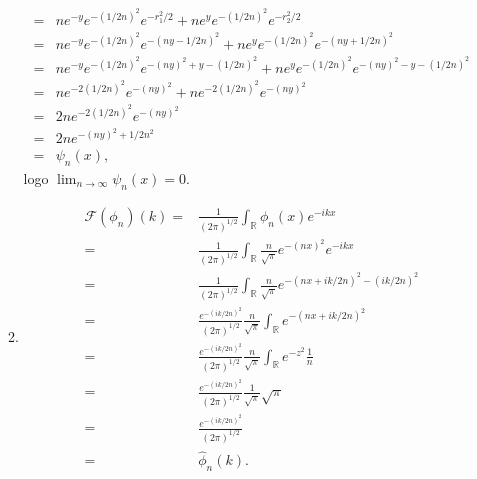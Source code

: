 \documentclass{article}
\begin{document}
\begin{enumerate}
\begin{enumerate}
$$\begin{aligned}
					\\
					= & ne^{-y}e^{- (1/2n)^{2}} e^{-r_{1}^{2}/2}+ ne^{y}e^{ - (1/2n)^{2}} e^{-r_{2}^{2}/2}
					\\
					= & ne^{-y}e^{- (1/2n)^{2}} e^{-(ny-1/2n)^{2}}+ ne^{y}e^{ - (1/2n)^{2}} e^{-(ny+1/2n)^{2}}
					\\
					= & ne^{-y}e^{- (1/2n)^{2}} e^{-(ny)^{2}+y - (1/2n)^{2}}+ ne^{y}e^{ - (1/2n)^{2}}e^{-(ny)^{2}-y - (1/2n)^{2}}
					\\
					= & ne^{- 2(1/2n)^{2}} e^{-(ny)^{2}}+ ne^{ -2 (1/2n)^{2}}e^{-(ny)^{2}}
					\\
					= & 2ne^{- 2(1/2n)^{2}} e^{-(ny)^{2}}
					\\
					= & 2n e^{-(ny)^{2}+  1/2n^{2}}
					\\
					= & \psi_{n}(x),
					\end{aligned}
					$$
					logo $\lim_{n \to \infty} \psi_{n}(x) = 0$.
					
					\item
						$$
						\begin{aligned}
						\mathcal{F}(\phi_{n})(k) = & \frac{1}{(2\pi)^{1/2}}\int_{\mathbb{R}} \phi_{n}(x)e^{-ikx}
						\\
						 = & \frac{1}{(2\pi)^{1/2}}\int_{\mathbb{R}} \frac{n}{\sqrt{\pi}}e^{-(nx)^{2}} e^{-ikx}
						 \\
						 = & \frac{1}{(2\pi)^{1/2}}\int_{\mathbb{R}} \frac{n}{\sqrt{\pi}}e^{-(nx + ik/2n)^{2} - (ik/2n)^{2}}
						 \\
						 = & \frac{e^{-(ik/2n)^{2}}}{(2\pi)^{1/2}} \frac{n}{\sqrt{\pi}} \int_{\mathbb{R}} e^{-(nx + ik/2n)^{2}}
						 \\
						 = & \frac{e^{-(ik/2n)^{2}}}{(2\pi)^{1/2}} \frac{n}{\sqrt{\pi}} \int_{\mathbb{R}} e^{-z^{2}} \frac{1}{n}
						 \\
						 = & \frac{e^{-(ik/2n)^{2}}}{(2\pi)^{1/2}} \frac{1}{\sqrt{\pi}} \sqrt{\pi}
						 \\
						 = & \frac{e^{-(ik/2n)^{2}}}{(2\pi)^{1/2}}
						 \\
						 = & \hat{\phi}_{n}(k).
						\end{aligned}
						$$
			\end{enumerate}
	\end{enumerate}
	
	
\end{document}
